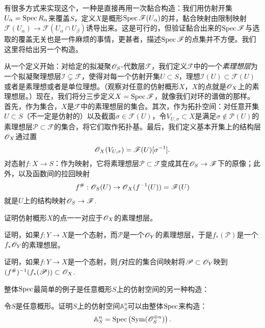 有很多方式来实现这个，一种是直接再用一次黏合构造：我们用仿射开集$U_\alpha=\operatorname{Spec} R_\alpha$来覆盖$S$，定义$X$是概形$\operatorname{Spec} \mathscr F(U_\alpha)$的并，黏合映射由限制映射$\mathscr F(U_\alpha)\to \mathscr F(U_\alpha\cap U_\beta)$诱导出来。这是可行的，但验证黏合出来的$\operatorname{Spec} \mathscr F$与选取的覆盖无关也是一件麻烦的事情，更甚者，描述$\operatorname{Spec} \mathscr F$的点集并不方便。我们这里将给出另一个构造。

从一个定义开始：对给定的拟凝聚$\mathscr{O}_S$-代数层$\mathscr F$，我们定义$\mathscr F$中的一个\textit{素理想层}为一个拟凝聚理想层$\mathscr I \subsetneq \mathscr F$，使得对每一个仿射开集$U\subset S$，理想$\mathscr I(U)\subset \mathscr F(U)$或者是素理想或者是单位理想。（观察对任意的仿射概形$X$，$X$的点就是$\mathscr{O}_X$上的素理想层。）现在，我们将分三步定义$X=\operatorname{Spec} \mathscr F$，就像我们对环的谱做的那样。首先，作为集合，$X$是$\mathscr F$中的素理想层的集合。其次，作为拓扑空间：对任意开集$U\subset S$（不一定是仿射的）以及截面$\sigma \in \mathscr F(U)$，令$V_{U,\sigma}\subset X$是满足$\sigma\not\in \mathscr P(U)$的素理想层$\mathscr P \subset \mathscr F$的集合，将它们取作拓扑基。最后，我们定义基本开集上的结构层$\mathscr{O}_X$通过置
\[
	\mathscr{O}_X(V_{U,\sigma})=\mathscr F(U)[\sigma^{-1}].
\]
对态射$f:X\to S$：作为映射，它将素理想层$\mathscr P\subset \mathscr F$变成其在$\mathscr{O}_S\to \mathscr F$下的原像；此外，以及函数间的拉回映射
\[
	f^\#:\mathscr{O}_S(U)\to \mathscr{O}_X(f^{-1}(U))=\mathscr F(U)
\]
就是$U$上的结构映射$\mathscr{O}_S\to \mathscr F$.

\begin{exe}\label{exe:1.51}
证明仿射概形$X$的点一一对应于$\mathscr{O}_X$的素理想层。
\end{exe}

\begin{exe}\label{exe:1.52}
证明，如果$f:Y\to X$是一个态射，而$\mathscr P$是一个$\mathscr{O}_Y$的素理想层，于是$f_*(\mathscr P)$是一个$f_*\mathscr{O}_Y$的素理想层。
\end{exe}

\begin{exe}\label{exe:1.53}
证明，如果$f:Y\to X$是一个态射，则$f$对应的集合间映射将$\mathscr P\subset \mathscr{O}_Y$映到$(f^\#)^{-1}(f_*(\mathscr P))\subset \mathscr{O}_X$.
\end{exe}

整体$\operatorname{Spec}$最简单的例子是任意概形$S$上的仿射空间的另一种构造：

\begin{exe}\label{exe:1.54}
令$S$是任意概形。证明$S$上的仿射空间$\mathbb A^n_S$可以由整体$\operatorname{Spec}$来构造：
\[
	\mathbb A^n_S=\operatorname{Spec} \left(\mathrm{Sym}(\mathscr{O}_S^{\oplus n})\right).
\]
\end{exe}